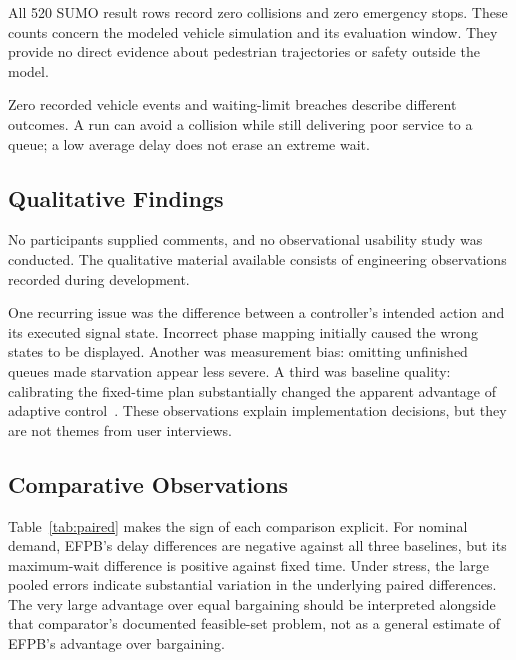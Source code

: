 \documentclass[sigconf]{acmart}
\begin{document}
All 520 SUMO result rows record zero collisions and zero emergency
stops. These counts concern the modeled vehicle simulation and
its evaluation window. They provide no direct evidence about
pedestrian trajectories or safety outside the model.

Zero recorded vehicle events and waiting-limit breaches describe
different outcomes. A run can avoid a collision while still delivering
poor service to a queue; a low average delay does not erase an
extreme wait.

\subsection{Qualitative Findings}
No participants supplied comments, and no observational usability
study was conducted. The qualitative material available consists
of engineering observations recorded during development.

One recurring issue was the difference between a controller's
intended action and its executed signal state. Incorrect phase
mapping initially caused the wrong states to be displayed.
Another was measurement bias: omitting unfinished queues made
starvation appear less severe. A third was baseline quality:
calibrating the fixed-time plan substantially changed the apparent
advantage of adaptive control~\cite{runreport}. These observations
explain implementation decisions, but they are not themes from
user interviews.

\subsection{Comparative Observations}
Table~\ref{tab:paired} makes the sign of each comparison explicit.
For nominal demand, EFPB's delay differences are negative against
all three baselines, but its maximum-wait difference is positive
against fixed time. Under stress, the large pooled errors indicate
substantial variation in the underlying paired differences. The
very large advantage over equal bargaining should be interpreted
alongside that comparator's documented feasible-set problem,
not as a general estimate of EFPB's advantage over bargaining.
\end{document}
